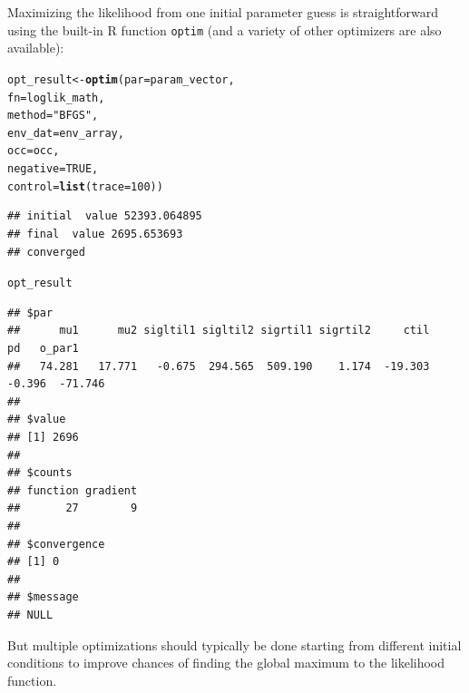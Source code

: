 \documentclass[11pt]{article}\usepackage[]{graphicx}\usepackage[]{xcolor}
\makeatletter
\newcommand{\hlnum}[1]{\textcolor[rgb]{0.686,0.059,0.569}{#1}}%
\newcommand{\hlsng}[1]{\textcolor[rgb]{0.192,0.494,0.8}{#1}}%
\newcommand{\hldef}[1]{\textcolor[rgb]{0.345,0.345,0.345}{#1}}%
\newcommand{\hlkwb}[1]{\textcolor[rgb]{0.69,0.353,0.396}{#1}}%
\newcommand{\hlkwc}[1]{\textcolor[rgb]{0.333,0.667,0.333}{#1}}%
\newcommand{\hlkwd}[1]{\textcolor[rgb]{0.737,0.353,0.396}{\textbf{#1}}}%
\newenvironment{kframe}{%
 \def\at@end@of@kframe{}%
 \ifinner\ifhmode%
  \def\at@end@of@kframe{\end{minipage}}%
  \begin{minipage}{\columnwidth}%
 \fi\fi%
 \def\FrameCommand##1{\hskip\@totalleftmargin \hskip-\fboxsep
 \colorbox{shadecolor}{##1}\hskip-\fboxsep
     \hskip-\linewidth \hskip-\@totalleftmargin \hskip\columnwidth}%
 \MakeFramed {\advance\hsize-\width
   \@totalleftmargin\z@ \linewidth\hsize
   \@setminipage}}%
 {\par\unskip\endMakeFramed%
 \at@end@of@kframe}
\newenvironment{knitrout}{}{} %
\makeatother
\begin{document}
Maximizing the likelihood from one initial parameter guess is straightforward using the built-in
R function \texttt{optim} (and a variety of other optimizers are also available):
\begin{knitrout}
\color{fgcolor}\begin{kframe}
\begin{alltt}
\hldef{opt_result} \hlkwb{<-} \hlkwd{optim}\hldef{(}\hlkwc{par} \hldef{= param_vector,}
      \hlkwc{fn} \hldef{= loglik_math,}
      \hlkwc{method} \hldef{=} \hlsng{"BFGS"}\hldef{,}
      \hlkwc{env_dat} \hldef{= env_array,}
      \hlkwc{occ} \hldef{= occ,}
      \hlkwc{negative} \hldef{=} \hlnum{TRUE}\hldef{,}
      \hlkwc{control} \hldef{=} \hlkwd{list}\hldef{(}\hlkwc{trace}\hldef{=}\hlnum{100}\hldef{))}
\end{alltt}
\begin{verbatim}
## initial  value 52393.064895 
## final  value 2695.653693 
## converged
\end{verbatim}
\begin{alltt}
\hldef{opt_result}
\end{alltt}
\begin{verbatim}
## $par
##      mu1      mu2 sigltil1 sigltil2 sigrtil1 sigrtil2     ctil       pd   o_par1 
##   74.281   17.771   -0.675  294.565  509.190    1.174  -19.303   -0.396  -71.746 
## 
## $value
## [1] 2696
## 
## $counts
## function gradient 
##       27        9 
## 
## $convergence
## [1] 0
## 
## $message
## NULL
\end{verbatim}
\end{kframe}
\end{knitrout}
\noindent But multiple optimizations should typically be done starting from different 
initial conditions to improve chances of finding the global maximum to the likelihood
function. 
\end{document}
